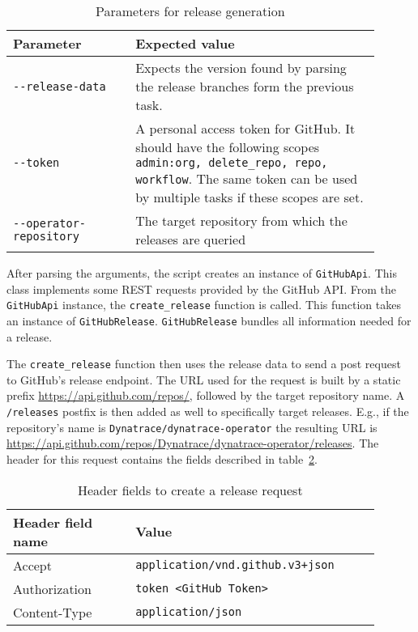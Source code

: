 \begin{table}[H]
    \centering
    \caption{Parameters for release generation}
    \label{tab:parameters-for-release-generation}
    \begin{tabular}{p{0.3\linewidth}|p{0.6\linewidth}}
        Parameter & Expected value \\
        \hline
        \verb|--release-data| & Expects the version found by parsing the release branches form the previous task. \\
        \verb|--token| & A personal access token for GitHub.
            It should have the following scopes \verb|admin:org, delete_repo, repo, workflow|.
            The same token can be used by multiple tasks if these scopes are set. \\
        \verb|--operator-repository| & The target repository from which the releases are queried \\
    \end{tabular}
\end{table}

After parsing the arguments, the script creates an instance of \verb|GitHubApi|.
This class implements some REST requests provided by the GitHub API.
From the \verb|GitHubApi| instance, the \verb|create_release| function is called.
This function takes an instance of \verb|GitHubRelease|.
\verb|GitHubRelease| bundles all information needed for a release.

The \verb|create_release| function then uses the release data to send a post request to GitHub's release endpoint.
The URL used for the request is built by a static prefix \url{https://api.github.com/repos/}, followed by the target repository name.
A \verb|/releases| postfix is then added as well to specifically target releases.
E.g., if the repository's name is \verb|Dynatrace/dynatrace-operator| the resulting URL is \url{https://api.github.com/repos/Dynatrace/dynatrace-operator/releases}.
The header for this request contains the fields described in table~\ref{tab:header-fields-to-create-a-release-request}.

\begin{table}[H]
    \centering
    \caption{Header fields to create a release request}
    \label{tab:header-fields-to-create-a-release-request}
    \begin{tabular}{p{0.3\linewidth}|p{0.6\linewidth}}
        Header field name & Value \\
        \hline
        Accept & \verb|application/vnd.github.v3+json|  \\
        Authorization & \verb|token <GitHub Token>| \\
        Content-Type & \verb|application/json| \\
    \end{tabular}
\end{table}

